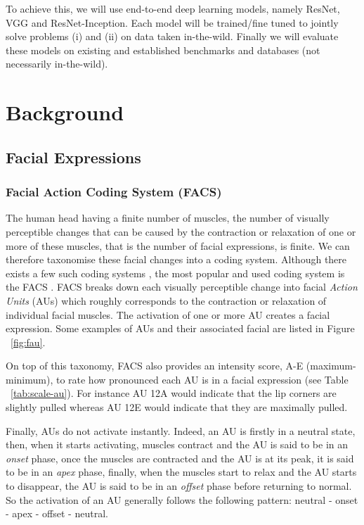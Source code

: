 \documentclass[12pt,twoside]{article}
\begin{document}
To achieve this, we will use end-to-end deep learning models, namely ResNet, VGG and ResNet-Inception. Each model will be trained/fine tuned to jointly solve problems (i) and (ii) on data taken in-the-wild. Finally we will evaluate these models on existing and established benchmarks and databases (not necessarily in-the-wild).


\clearpage
\section{Background}

\subsection{Facial Expressions}

\subsubsection{Facial Action Coding System (FACS)}

The human head having a finite number of muscles, the number of visually perceptible changes that can be caused by the contraction or relaxation of one or more of these muscles, that is the number of facial expressions, is finite. We can therefore taxonomise these facial changes into a coding system. Although there exists a few such coding systems \cite{RefWorks:13}, the most popular and used coding system is the FACS \cite{RefWorks:10}. FACS breaks down each visually perceptible change into facial \textit{Action Units} (AUs) which roughly corresponds to the contraction or relaxation of individual facial muscles. The activation of one or more AU creates a facial expression. Some examples of AUs and their associated facial are listed in Figure ~\ref{fig:fau}.

On top of this taxonomy, FACS also provides an intensity score, A-E (maximum-minimum), to rate how pronounced each AU is in a facial expression (see Table ~\ref{tab:scale-au}). For instance AU 12A would indicate that the lip corners are slightly pulled whereas AU 12E would indicate that they are maximally pulled.

Finally, AUs do not activate instantly. Indeed, an AU is firstly in a neutral state, then, when it starts activating, muscles contract and the AU is said to be in an \textit{onset} phase, once the muscles are contracted and the AU is at its peak, it is said to be in an \textit{apex} phase, finally, when the muscles start to relax and the AU starts to disappear, the AU is said to be in an \textit{offset} phase before returning to normal. So the activation of an AU generally follows the following pattern: neutral - onset - apex - offset - neutral.
\end{document}

